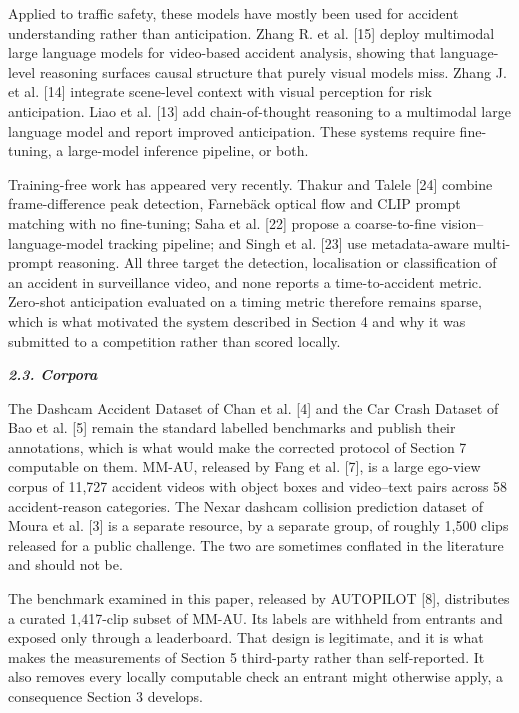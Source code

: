 Applied to traffic safety, these models have mostly been used for accident understanding rather than anticipation. Zhang R. et al. {[}15{]} deploy multimodal large language models for video-based accident analysis, showing that language-level reasoning surfaces causal structure that purely visual models miss. Zhang J. et al. {[}14{]} integrate scene-level context with visual perception for risk anticipation. Liao et al. {[}13{]} add chain-of-thought reasoning to a multimodal large language model and report improved anticipation. These systems require fine-tuning, a large-model inference pipeline, or both.

Training-free work has appeared very recently. Thakur and Talele {[}24{]} combine frame-difference peak detection, Farnebäck optical flow and CLIP prompt matching with no fine-tuning; Saha et al. {[}22{]} propose a coarse-to-fine vision--language-model tracking pipeline; and Singh et al. {[}23{]} use metadata-aware multi-prompt reasoning. All three target the detection, localisation or classification of an accident in surveillance video, and none reports a time-to-accident metric. Zero-shot anticipation evaluated on a timing metric therefore remains sparse, which is what motivated the system described in Section 4 and why it was submitted to a competition rather than scored locally.

\emph{\textbf{2.3. Corpora}}

The Dashcam Accident Dataset of Chan et al. {[}4{]} and the Car Crash Dataset of Bao et al. {[}5{]} remain the standard labelled benchmarks and publish their annotations, which is what would make the corrected protocol of Section 7 computable on them. MM-AU, released by Fang et al. {[}7{]}, is a large ego-view corpus of 11,727 accident videos with object boxes and video--text pairs across 58 accident-reason categories. The Nexar dashcam collision prediction dataset of Moura et al. {[}3{]} is a separate resource, by a separate group, of roughly 1,500 clips released for a public challenge. The two are sometimes conflated in the literature and should not be.

The benchmark examined in this paper, released by AUTOPILOT {[}8{]}, distributes a curated 1,417-clip subset of MM-AU. Its labels are withheld from entrants and exposed only through a leaderboard. That design is legitimate, and it is what makes the measurements of Section 5 third-party rather than self-reported. It also removes every locally computable check an entrant might otherwise apply, a consequence Section 3 develops.

